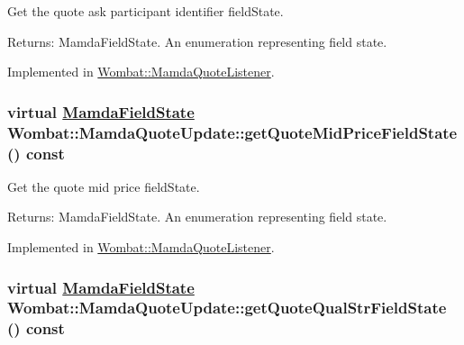 Get the quote ask participant identifier field\-State. 

\begin{Desc}
\item[Returns:]Mamda\-Field\-State. An enumeration representing field state. \end{Desc}


Implemented in \hyperlink{classWombat_1_1MamdaQuoteListener_9208a03480064d6bd80ed3b95136c752}{Wombat::Mamda\-Quote\-Listener}.\hypertarget{classWombat_1_1MamdaQuoteUpdate_cca1afbde4ff0fc48e9b245e0fc1c619}{
\subsubsection[getQuoteMidPriceFieldState]{\setlength{\rightskip}{0pt plus 5cm}virtual \hyperlink{namespaceWombat_93aac974f2ab713554fd12a1fa3b7d2a}{Mamda\-Field\-State} Wombat::Mamda\-Quote\-Update::get\-Quote\-Mid\-Price\-Field\-State () const}}
\label{classWombat_1_1MamdaQuoteUpdate_cca1afbde4ff0fc48e9b245e0fc1c619}


Get the quote mid price field\-State. 

\begin{Desc}
\item[Returns:]Mamda\-Field\-State. An enumeration representing field state. \end{Desc}


Implemented in \hyperlink{classWombat_1_1MamdaQuoteListener_19d19b0f64db3586e14b88f4a502ecbf}{Wombat::Mamda\-Quote\-Listener}.\hypertarget{classWombat_1_1MamdaQuoteUpdate_26ce555948a2fa3cbec38b61d7dd8195}{
\subsubsection[getQuoteQualStrFieldState]{\setlength{\rightskip}{0pt plus 5cm}virtual \hyperlink{namespaceWombat_93aac974f2ab713554fd12a1fa3b7d2a}{Mamda\-Field\-State} Wombat::Mamda\-Quote\-Update::get\-Quote\-Qual\-Str\-Field\-State () const}}
\label{classWombat_1_1MamdaQuoteUpdate_26ce555948a2fa3cbec38b61d7dd8195}


